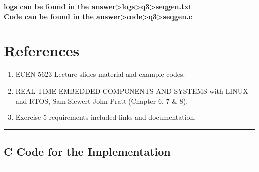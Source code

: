 \documentclass[a4paper,11pt]{article}%
\newenvironment{qanda}{\setlength{\parindent}{0pt}}{\bigskip}
\begin{document}
\begin{qanda}
			\textbf{logs can be found in the answer\textgreater logs\textgreater q3\textgreater seqgen.txt}\\
			\textbf{Code can be found in the answer\textgreater code\textgreater q3\textgreater seqgen.c}


	\section{References}
	\begin{enumerate}
		\item ECEN 5623 Lecture slides material and example codes.
		\item REAL-TIME EMBEDDED COMPONENTS AND SYSTEMS with LINUX and RTOS, Sam Siewert John
		      Pratt (Chapter 6, 7 \& 8).
		\item Exercise 5 requirements included links and documentation.
	\end{enumerate}


\end{qanda}




\vfill
\hrule
\vspace{0.5cm}
\pagebreak
\begin{appendices}
	\section{C Code for the Implementation}
	
	\pagebreak
	
	\pagebreak
	
\end{appendices}


\vspace{1cm}
\hrule
\vspace{0.5cm}


\end{document}
